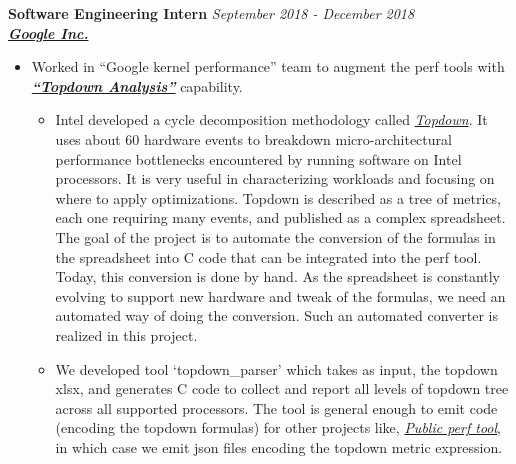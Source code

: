 \documentclass[9pt]{article}
\newenvironment{changemargin}[2]{%
  \begin{list}{}{%
    \setlength{\topsep}{0pt}%
    \setlength{\leftmargin}{#1}%
    \setlength{\rightmargin}{#2}%
    \setlength{\listparindent}{\parindent}%
    \setlength{\itemindent}{\parindent}%
    \setlength{\parsep}{\parskip}%
  }%
  \item[]}{\end{list}
}
\newenvironment{body} {
	\vspace*{-16pt}
	\begin{changemargin}{-0.25in}{-0.5in}
  }	
	{\end{changemargin}
}
\begin{document}
\begin{body}
        \textbf{Software Engineering Intern} \hfill \emph{September 2018 - December 2018}\\
	\textbf{\emph{\href{https://www.google.com/intl/en/about/}{Google Inc.}}}
	\begin{itemize} \itemsep -0pt
		\item  Worked in ``Google kernel performance'' team to augment the perf
			tools with \textbf{\emph{\href{https://ieeexplore.ieee.org/document/6844459}{``Topdown Analysis''}}} capability.
			\begin{itemize}
                                \item Intel developed a cycle decomposition
                                methodology called
                                \emph{\href{https://ieeexplore.ieee.org/document/6844459}{Topdown}}.
                                It uses about 60 hardware events to breakdown
                                micro-architectural performance bottlenecks
                                encountered by running software on Intel
                                processors. It is very useful in characterizing
                                workloads and focusing on where to apply
                                optimizations.  Topdown is described as a tree
                                of metrics, each one requiring many events, and
                                published as a complex spreadsheet. The goal of
                                the project is to automate the conversion of
                                the formulas in the spreadsheet into C code
                                that can be integrated into the perf tool.
                                Today, this conversion is done by hand. As the
                                spreadsheet is constantly evolving to support
                                new hardware and tweak of the formulas, we need an
                                automated way of doing the conversion. Such an
                                automated converter is realized in this
                                project.

                                \item We developed tool ‘topdown\_parser’ which
                                takes as input, the topdown xlsx, and generates
                                C code to collect and report all levels of
                                topdown tree across all supported processors.
                                The tool is general enough to emit code
                                (encoding the topdown formulas) for other
                                projects like,
                                \emph{\href{https://git.kernel.org/pub/scm/linux/kernel/git/tip/tip.git/tree/tools/perf}{
                                  Public perf tool}}, in which case we emit
                                  json files encoding the topdown metric
                                  expression.


\end{itemize}
\end{itemize}
\end{body}
\end{document}
